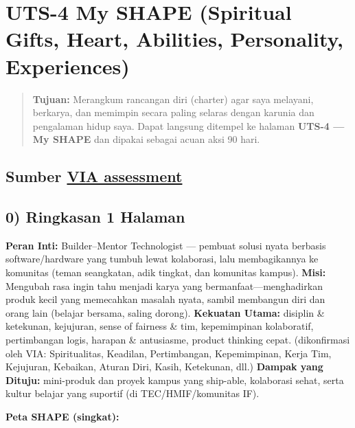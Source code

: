 \documentclass[
  letterpaper,
  DIV=11,
  numbers=noendperiod]{scrreprt}
\begin{document}
\chapter{UTS-4 My SHAPE (Spiritual Gifts, Heart, Abilities, Personality,
Experiences)}\label{uts-4-my-shape-spiritual-gifts-heart-abilities-personality-experiences}

\begin{quote}
\textbf{Tujuan:} Merangkum rancangan diri (charter) agar saya melayani,
berkarya, dan memimpin secara paling selaras dengan karunia dan
pengalaman hidup saya. Dapat langsung ditempel ke halaman \textbf{UTS-4
--- My SHAPE} dan dipakai sebagai acuan aksi 90 hari.
\end{quote}

\section{\texorpdfstring{Sumber
\href{StrengthsProfile-Muhammad-Farrel.pdf}{VIA
assessment}}{Sumber VIA assessment}}\label{sumber-via-assessment}

\section{0) Ringkasan 1 Halaman}\label{ringkasan-1-halaman}

\textbf{Peran Inti:} Builder--Mentor Technologist --- pembuat solusi
nyata berbasis software/hardware yang tumbuh lewat kolaborasi, lalu
membagikannya ke komunitas (teman seangkatan, adik tingkat, dan
komunitas kampus). \textbf{Misi:} Mengubah rasa ingin tahu menjadi karya
yang bermanfaat---menghadirkan produk kecil yang memecahkan masalah
nyata, sambil membangun diri dan orang lain (belajar bersama, saling
dorong). \textbf{Kekuatan Utama:} disiplin \& ketekunan, kejujuran,
sense of fairness \& tim, kepemimpinan kolaboratif, pertimbangan logis,
harapan \& antusiasme, product thinking cepat. (dikonfirmasi oleh VIA:
Spiritualitas, Keadilan, Pertimbangan, Kepemimpinan, Kerja Tim,
Kejujuran, Kebaikan, Aturan Diri, Kasih, Ketekunan, dll.) \textbf{Dampak
yang Dituju:} mini-produk dan proyek kampus yang ship-able, kolaborasi
sehat, serta kultur belajar yang suportif (di TEC/HMIF/komunitas IF).

\textbf{Peta SHAPE (singkat):}
\end{document}
